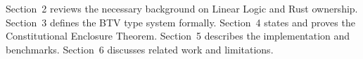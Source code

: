 \noindent
Section~2 reviews the necessary background on Linear Logic and Rust ownership.
Section~3 defines the BTV type system formally.
Section~4 states and proves the Constitutional Enclosure Theorem.
Section~5 describes the implementation and benchmarks.
Section~6 discusses related work and limitations.
